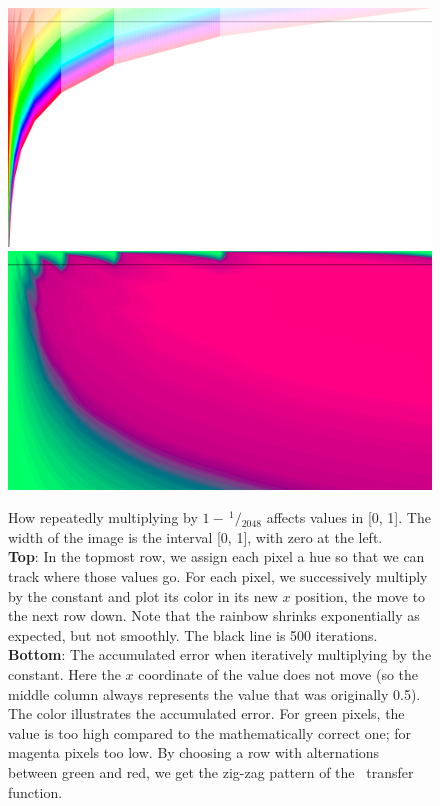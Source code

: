 \documentclass[twocolumn]{article}
\newcommand\sfrac[2]{\!{}\,^{#1}\!/{}\!_{#2}}
\begin{document}
\begin{figure}[t!p]
  \begin{center}
    \includegraphics[width=0.85 \linewidth]{rainbow} \\[1em]
    \includegraphics[width=0.85 \linewidth]{rainbow-error}
  \end{center}
  \caption{
    How repeatedly multiplying by $1 - \sfrac{1}{2048}$ affects values in
    [0, 1].
    The width of the image is the interval [0, 1], with zero at the left.
    \\[1em]
    {\bf Top}: In the topmost row, we assign each pixel a hue so that
    we can track where those values go. For each pixel, we
    successively multiply by the constant and plot its color in its
    new $x$ position, the move to the next row down. Note that the
    rainbow shrinks exponentially as expected, but not smoothly.
    The black line is 500 iterations.
    \\[1em]
    {\bf Bottom}: The accumulated error when iteratively multiplying
    by the constant. Here the $x$ coordinate of the value does not move
    (so the middle column always represents the value that was
    originally 0.5). The color illustrates the accumulated error. For
    green pixels, the value is too high compared to the mathematically
    correct one; for magenta pixels too low. By choosing a row with
    alternations between green and red, we get the zig-zag pattern of
    the \gradone\ transfer function.
  } \label{fig:rainbow}
\end{figure}
\end{document}
